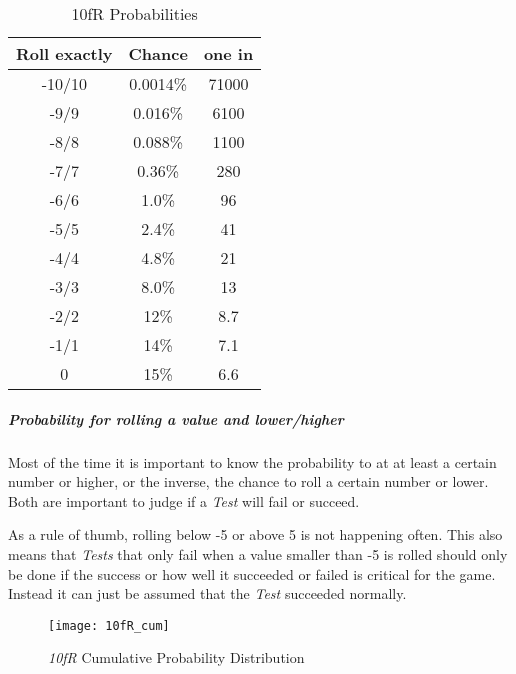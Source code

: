\begin{table}[htb]
    \caption[10fR Probabilities]{10fR Probabilities}
    \label{tab:10fR probabilities}
    \centering
    \begin{tabular}{ccc}
        \toprule
        \textbf{Roll exactly} & \textbf{Chance} & \textbf{one in} \\
        \midrule
        -10/10                & 0.0014\%        & 71000           \\
        -9/9                  & 0.016\%         & 6100            \\
        -8/8                  & 0.088\%         & 1100            \\
        -7/7                  & 0.36\%          & 280             \\
        -6/6                  & 1.0\%           & 96              \\
        -5/5                  & 2.4\%           & 41              \\
        -4/4                  & 4.8\%           & 21              \\
        -3/3                  & 8.0\%           & 13              \\
        -2/2                  & 12\%            & 8.7             \\
        -1/1                  & 14\%            & 7.1             \\
        0                     & 15\%            & 6.6             \\
        \bottomrule
    \end{tabular}
\end{table}

\subparagraph{Probability for rolling a value and lower/higher}


Most of the time it is important to know the probability to at at least a certain
number or higher, or the inverse, the chance to roll a certain number or lower.
Both are important to judge if a \emph{Test} will fail or succeed.

As a rule of thumb, rolling below -5 or above 5 is not happening often. This also
means that \emph{Tests} that only fail when a value smaller than -5 is rolled should
only be done if the success or how well it succeeded or failed is critical for the game.
Instead it can just be assumed that the \emph{Test} succeeded normally.

\begin{figure}[htb]
    \caption{\emph{10fR} Cumulative Probability Distribution}
    \texttt{[image: 10fR\_cum]}
\end{figure}

